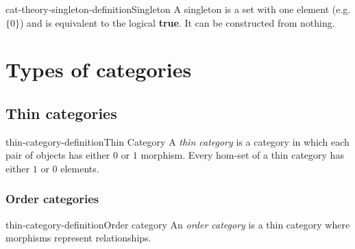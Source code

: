 \documentclass[preview]{standalone}
\begin{document}
\begin{snippetdefinition}{cat-theory-singleton-definition}{Singleton}
    A singleton is a set with one element (e.g. \(\{0\}\)) and
    is equivalent to the logical \textbf{true}.
    It can be constructed from nothing.
\end{snippetdefinition}



\section{Types of categories}

\subsection{Thin categories}

\begin{snippetdefinition}{thin-category-definition}{Thin Category}
    A \textit{thin category} is a category in which each pair of objects
    has either \(0\) or \(1\) morphism.
    Every hom-set of a thin category has either \(1\) or \(0\) elements.
\end{snippetdefinition}

\subsubsection{Order categories}

\begin{snippetdefinition}{thin-category-definition}{Order category}
    An \textit{order category} is a thin category where morphisms represent relationships.
\end{snippetdefinition}
\end{document}
